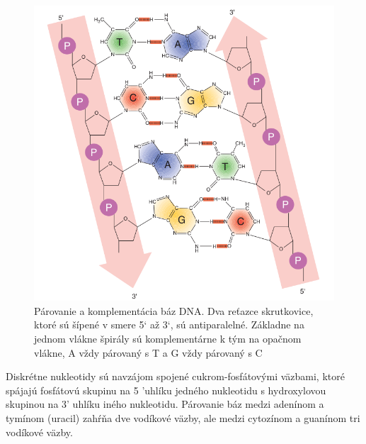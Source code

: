 \begin{figure}[!ht]
	\centering
	\includegraphics[width=.85\textwidth]{figures/nucleotides.png}
	\caption{Párovanie a komplementácia báz DNA. Dva reťazce skrutkovice, ktoré sú šípené v smere 5` až 3`, sú antiparalelné. Základne na jednom vlákne špirály
	sú komplementárne k tým na opačnom vlákne, A vždy párovaný s T a G vždy párovaný s C \label{o:nucleotide}}
\end{figure}

Diskrétne nukleotidy sú navzájom spojené cukrom-fosfátovými väzbami, ktoré spájajú fosfátovú skupinu na 5 'uhlíku jedného nukleotidu s hydroxylovou skupinou na 3' uhlíku iného nukleotidu.
Párovanie báz medzi adenínom a tymínom (uracil) zahŕňa dve vodíkové väzby, ale medzi cytozínom a guanínom tri vodíkové väzby. 

